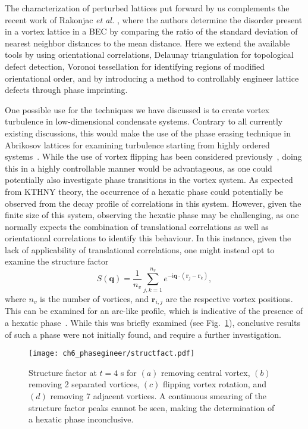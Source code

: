 The characterization of perturbed lattices put forward by us complements the recent work of Rakonjac \textit{et al.} \cite{VTX:Rankonjac_pra_2016}, where the authors determine the disorder present in a vortex lattice in a BEC by comparing the ratio of the standard deviation of nearest neighbor distances to the mean distance. Here we extend the available tools by using orientational correlations, Delaunay triangulation for topological defect detection, Voronoi tessellation for identifying regions of modified orientational order, and by introducing a method to controllably engineer lattice defects through phase imprinting.

One possible use for the techniques we have discussed is to create vortex turbulence in low-dimensional condensate systems. Contrary to all currently existing discussions, this would make the use of the phase erasing technique in Abrikosov lattices for examining turbulence starting from highly ordered systems~\cite{VTX:Neely_prl_2013,VTX:Kwon_pra_2014,VTX:Groszek_pra_2016}. While the use of vortex flipping has been considered previously~\cite{VTX:Madarassy_gfd_2009}, doing this in a highly controllable manner would be advantageous, as one could potentially also investigate phase transitions in the vortex system. As expected from KTHNY theory, the occurrence of a hexatic phase could potentially be observed from the decay profile of correlations in this system. However, given the finite size of this system, observing the hexatic phase may be challenging, as one normally expects the combination of translational correlations as well as orientational correlations to identify this behaviour. In this instance, given the lack of applicability of translational correlations, one might instead opt to examine the structure factor \[S(\mathbf{q}) = \frac{1}{n_v}\displaystyle\sum\limits_{j,k=1}^{n_v} e^{-\textrm{i}\mathbf{q}\cdot(\mathbf{r}_j - \mathbf{r}_k)},\] where $n_v$ is the number of vortices, and $\mathbf{r}_{i,j}$ are the respective vortex positions. This can be examined for an arc-like profile, which is indicative of the presence of a hexatic phase~\cite{CM:Brodin_cmp_2010,CM:Sun_scirep_2016}. While this was briefly examined (see Fig.~\ref{fig:struct_fact}), conclusive results of such a phase were not initially found, and require a further investigation.

\begin{figure}\centering
    \texttt{[image: ch6\_phasegineer/structfact.pdf]}
    \caption{Structure factor at $t=4$ s for $(a)$ removing central vortex, $(b)$ removing 2 separated vortices, $(c)$ flipping vortex rotation, and $(d)$ removing 7 adjacent vortices. A continuous smearing of the structure factor peaks cannot be seen, making the determination of a hexatic phase inconclusive.}\label{fig:struct_fact}
\end{figure}

